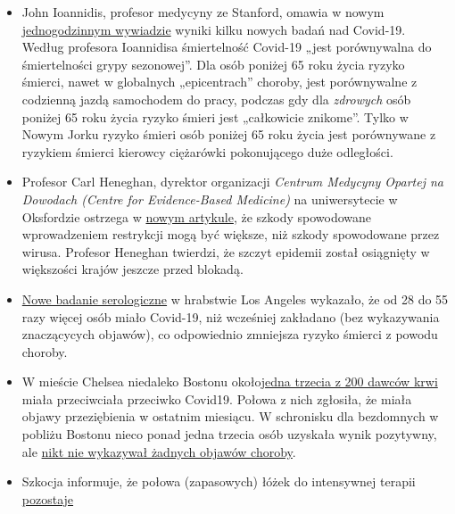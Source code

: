 \begin{itemize}
\tightlist
\item
  John Ioannidis, profesor medycyny ze Stanford, omawia w nowym
  \href{https://www.youtube.com/watch?v=cwPqmLoZA4s}{jednogodzinnym
  wywiadzie} wyniki kilku nowych badań nad Covid-19. Według profesora
  Ioannidisa śmiertelność Covid-19 „jest porównywalna do śmiertelności
  grypy sezonowej''. Dla osób poniżej 65 roku życia ryzyko śmierci,
  nawet w globalnych „epicentrach'' choroby, jest porównywalne z
  codzienną jazdą samochodem do pracy, podczas gdy dla \emph{zdrowych}
  osób poniżej 65 roku życia ryzyko śmieri jest „całkowicie znikome''.
  Tylko w Nowym Jorku ryzyko śmieri osób poniżej 65 roku życia jest
  porównywane z ryzykiem śmierci kierowcy ciężarówki pokonującego duże
  odległości.
\item
  Profesor Carl Heneghan, dyrektor organizacji \emph{Centrum Medycyny
  Opartej na Dowodach (}\emph{Centre for Evidence-Based Medicine)} na
  uniwersytecie w Oksfordzie ostrzega w
  \href{https://news.yahoo.com/lockdown-damage-outweighs-coronavirus-warning-121940675.html}{nowym
  artykule}, że szkody spowodowane wprowadzeniem restrykcji mogą być
  większe, niż szkody spowodowane przez wirusa. Profesor Heneghan
  twierdzi, że szczyt epidemii został osiągnięty w większości krajów
  jeszcze przed blokadą.
\item
  \href{http://publichealth.lacounty.gov/phcommon/public/media/mediapubhpdetail.cfm?prid=2328}{Nowe
  badanie serologiczne} w hrabstwie Los Angeles wykazało, że od 28 do 55
  razy więcej osób miało Covid-19, niż wcześniej zakładano (bez
  wykazywania znaczącycych objawów), co odpowiednio zmniejsza ryzyko
  śmierci z powodu choroby.
\item
  W mieście Chelsea niedaleko Bostonu
  około\href{https://archive.is/20200418222442/https://www.bostonglobe.com/2020/04/17/business/nearly-third-200-blood-samples-taken-chelsea-show-exposure-coronavirus/}{jedna
  trzecia z 200 dawców krwi} miała przeciwciała przeciwko Covid19.
  Połowa z nich zgłosiła, że miała objawy przeziębienia w ostatnim
  miesiącu. W schronisku dla bezdomnych w pobliżu Bostonu nieco ponad
  jedna trzecia osób uzyskała wynik pozytywny, ale
  \href{https://www.wsbtv.com/news/trending/coronavirus-cdc-reviewing-stunning-universal-testing-results-boston-homeless-shelter/ZADQ45HCAZEVJAZA3OTCUR7M6M/}{nikt
  nie wykazywał żadnych objawów choroby}.
\item
  Szkocja informuje, że połowa (zapasowych) łóżek do intensywnej terapii
  \href{https://www.heraldscotland.com/news/18377095.coronavirus-scotland-half-icu-beds-empty/}{pozostaje
}
\end{itemize}
